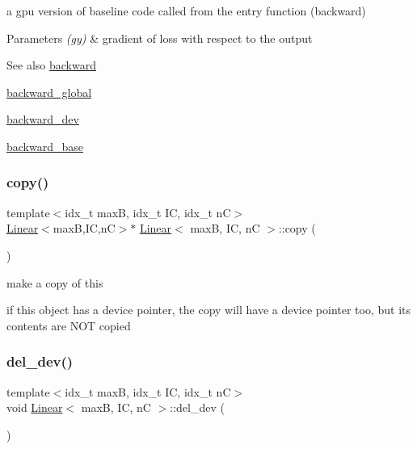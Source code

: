 a gpu version of baseline code called from the entry function (backward) 


\begin{DoxyParams}{Parameters}
{\em (gy)} & gradient of loss with respect to the output \\
\hline
\end{DoxyParams}
\begin{DoxySeeAlso}{See also}
\hyperlink{structLinear_aeaa39d38b876fbd70794621955193fd3}{backward} 

\hyperlink{softmaxcrossentropy_8h_a47d56a9a23e08247b227f4aac17413e0}{backward\+\_\+global} 

\hyperlink{structLinear_a865f8dedc402675cd5cf240fcfbcd258}{backward\+\_\+dev} 

\hyperlink{structLinear_adcabfb5486aad2c05dd94bae98acf168}{backward\+\_\+base} 
\end{DoxySeeAlso}
\mbox{\label{structLinear_a0c7811cf3a3731974b668f7e973a79f4}} 
\subsubsection{\texorpdfstring{copy()}{copy()}}
{\footnotesize\ttfamily template$<$idx\+\_\+t maxB, idx\+\_\+t IC, idx\+\_\+t nC$>$ \\
\hyperlink{structLinear}{Linear}$<$maxB,IC,nC$>$$\ast$ \hyperlink{structLinear}{Linear}$<$ maxB, IC, nC $>$\+::copy (\begin{DoxyParamCaption}{ }\end{DoxyParamCaption})\hspace{0.3cm}{\ttfamily [inline]}}



make a copy of this 

if this object has a device pointer, the copy will have a device pointer too, but its contents are N\+OT copied \mbox{\label{structLinear_ad691fa515105ec71c69eed5f0ae03af6}} 
\subsubsection{\texorpdfstring{del\+\_\+dev()}{del\_dev()}}
{\footnotesize\ttfamily template$<$idx\+\_\+t maxB, idx\+\_\+t IC, idx\+\_\+t nC$>$ \\
void \hyperlink{structLinear}{Linear}$<$ maxB, IC, nC $>$\+::del\+\_\+dev (\begin{DoxyParamCaption}{ }\end{DoxyParamCaption})\hspace{0.3cm}{\ttfamily [inline]}}



